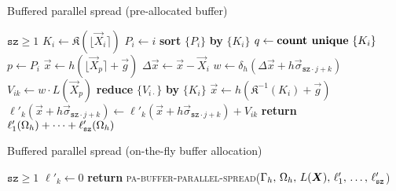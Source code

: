 \begin{algorithm}
\caption{Buffered parallel spread (pre-allocated buffer)}
\label{algo:pa-spread}
\begin{algorithmic}
\Require $\texttt{sz} \ge 1$
    \State $K_i \gets \mathfrak{K}(\lfloor\vec{X}_i\rceil)$ 
    \State $P_i \gets i$ 
\EndFor
\State \textbf{sort} $\{P_i\}$ \textbf{by} $\{K_i\}$
\State $q \gets \text{\textbf{count unique} }\{K_i\}$
        \State $p \gets P_i$
        \State $\vec{x} \gets h(\lfloor\vec{X}_p\rceil+\vec{g})$
        \State $\Delta\vec{x} \gets \vec{x}-\vec{X}_i$
            \State $w \gets \delta_h(\Delta\vec{x}+h\vec{\sigma}_{\texttt{sz}\cdot j + k})$
            \State $V_{ik} \gets w \cdot L(\vec{X}_p)$ 
        \EndFor
    \EndFor
    \State \textbf{reduce} $\{V_{i\cdot}\}$ \textbf{by} $\{K_i\}$
        \State $\vec{x} \gets h(\mathfrak{K}^{-1}(K_i) + \vec{g})$
        \State $\ell'_k(\vec{x} + h\vec{\sigma}_{\texttt{sz}\cdot j + k}) \gets
                \ell'_k(\vec{x} + h\vec{\sigma}_{\texttt{sz}\cdot j + k}) + V_{ik}$
        \EndFor
    \EndFor
\EndFor
\State \textbf{return} $\ell'_1(\Omega_h) + \cdots + \ell'_\texttt{sz}(\Omega_h)$
\EndProcedure
\end{algorithmic}
\end{algorithm}

\begin{algorithm}
\caption{Buffered parallel spread (on-the-fly buffer allocation)}
\label{algo:otf-spread}
\begin{algorithmic}
\Require $\texttt{sz} \ge 1$
    \State $\ell'_k \gets 0$
\EndFor
\State \textbf{return} \textsc{pa-buffer-parallel-spread}($\Gamma_h,\,\Omega_h,\,L(\boldsymbol{X}),\,\ell'_1,\,\ldots,\,\ell'_\texttt{sz}$) 
\EndProcedure {}
\end{algorithmic}
\end{algorithm}
\egroup

